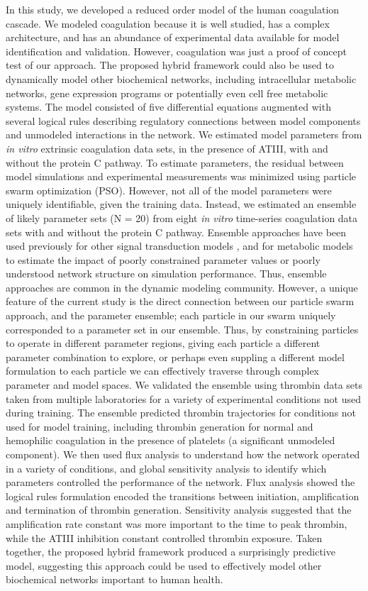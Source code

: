 \documentclass[processes,article,received,moreauthors,pdftex,12pt,a4paper]{mdpi}
\begin{document}
In this study, we developed a reduced order model of the human coagulation cascade.
We modeled coagulation because it is well studied, has a complex architecture, 
and has an abundance of experimental data available for model identification and validation. 
However, coagulation was just a proof of concept test of our approach. 
The proposed hybrid framework could also be used to dynamically model other biochemical networks, including intracellular metabolic networks, gene expression programs 
or potentially even cell free metabolic systems. 
The model consisted of five differential equations augmented with several logical rules describing 
regulatory connections between model components and unmodeled interactions in the network. 
We estimated model parameters from \textit{in vitro} extrinsic coagulation data sets, in the presence of ATIII, with and without the protein C pathway. 
To estimate parameters, the residual between model simulations and experimental measurements was minimized using particle swarm optimization (PSO). 
However, not all of the model parameters were uniquely identifiable, given the training data.
Instead, we estimated an ensemble of likely parameter sets (N = 20)
from eight \emph{in vitro} time-series coagulation data sets with and without the protein C pathway.
Ensemble approaches have been used previously for other signal transduction models \citep{Kuepfer:2007aa,Song:2009aa,2010_song_varner_BiotechJ,Tasseff:2010aa,Lequieu:2011aa}, 
and for metabolic models \citep{Tran:2008aa} to 
estimate the impact of poorly constrained parameter values or poorly understood network structure on simulation performance. 
Thus, ensemble approaches are common in the dynamic modeling community. 
However, a unique feature of the current study is the direct connection between our particle swarm approach, 
and the parameter ensemble; each particle in our swarm uniquely corresponded to a parameter set in our ensemble. 
Thus, by constraining particles to operate in different parameter regions, giving each particle a different parameter combination to explore, 
or perhaps even suppling a different model formulation to each particle we can effectively 
traverse through complex parameter and model spaces. 
We validated the ensemble using thrombin data sets taken from multiple laboratories for a variety of experimental conditions not used during training. 
The ensemble predicted thrombin trajectories for conditions not used for model training, including thrombin generation for normal and hemophilic coagulation 
in the presence of platelets (a significant unmodeled component).
We then used flux analysis to understand how the network operated in a variety of conditions, and global sensitivity analysis to identify which parameters controlled the 
performance of the network. Flux analysis showed the logical rules formulation encoded the transitions between initiation, amplification and termination of thrombin generation.
Sensitivity analysis suggested that the amplification rate constant was more important to the time to peak thrombin, while the ATIII inhibition constant controlled thrombin exposure.
Taken together, the proposed hybrid framework produced a surprisingly predictive model, suggesting this approach could 
be used to effectively model other biochemical networks important to human health. 
\end{document}
